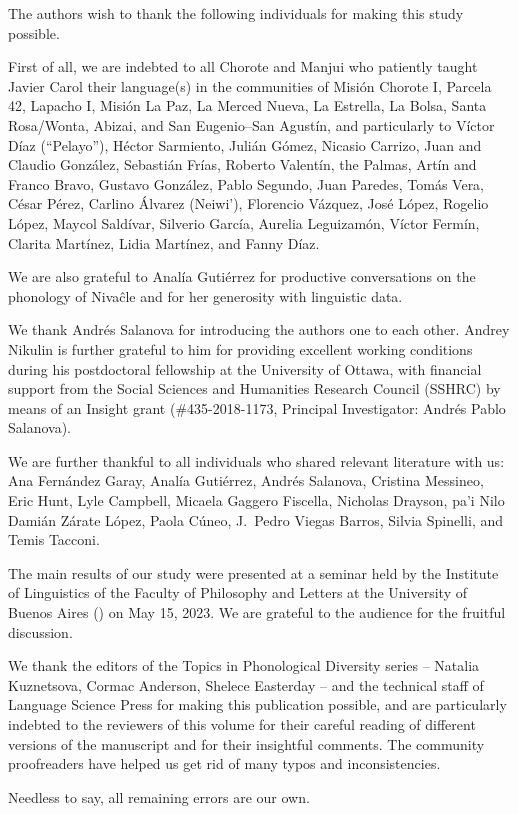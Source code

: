 \addchap{\lsAcknowledgementTitle} 

The authors wish to thank the following individuals for making this study possible.

First of all, we are indebted to all Chorote and Manjui who patiently taught Javier Carol their language(s) in the communities of Misión Chorote I, Parcela 42, Lapacho I, Misión La Paz, La Merced Nueva, La Estrella, La Bolsa, Santa Rosa/Wonta, Abizai, and San Eugenio–San Agustín, and particularly to Víctor Díaz (“Pelayo”), Héctor Sarmiento, Julián Gómez, Nicasio Carrizo, Juan and Claudio González, Sebastián Frías, Roberto Valentín, the Palmas, Artín and Franco Bravo, Gustavo González, Pablo Segundo, Juan Paredes, Tomás Vera, César Pérez, Carlino Álvarez (Neiwi’), Florencio Vázquez, José López, Rogelio López, Maycol Saldívar, Silverio García, Aurelia Leguizamón, Víctor Fermín, Clarita Martínez, Lidia Martínez, and Fanny Díaz.

We are also grateful to Analía Gutiérrez for productive conversations on the phonology of Nivaĉle and for her generosity with linguistic data.

We thank Andrés Salanova for introducing the authors one to each other. Andrey Nikulin is further grateful to him for providing excellent working conditions during his postdoctoral fellowship at the University of Ottawa, with financial support from the Social Sciences and Humanities Research Council (SSHRC) by means of an Insight grant (\#435-2018-1173, Principal Investigator: Andrés Pablo Salanova).

We are further thankful to all individuals who shared relevant literature with us: Ana Fernández Garay, Analía Gutiérrez, Andrés Salanova, Cristina Messineo, Eric Hunt, Lyle Campbell, Micaela Gaggero Fiscella, Nicholas Drayson, pa’i Nilo Damián Zárate López, Paola Cúneo, J.~Pedro Viegas Barros, Silvia Spinelli, and Temis Tacconi.

The main results of our study were presented at a seminar held by the Institute of Linguistics of the Faculty of Philosophy and Letters at the University of Buenos Aires () on May 15, 2023. We are grateful to the audience for the fruitful discussion.

We thank the editors of the Topics in Phonological Diversity series -- Natalia Kuznetsova, Cormac Anderson, Shelece Easterday -- and the technical staff of Language Science Press for making this publication possible, and are particularly indebted to the reviewers of this volume for their careful reading of different versions of the manuscript and for their insightful comments. The community proofreaders have helped us get rid of many typos and inconsistencies.

Needless to say, all remaining errors are our own.